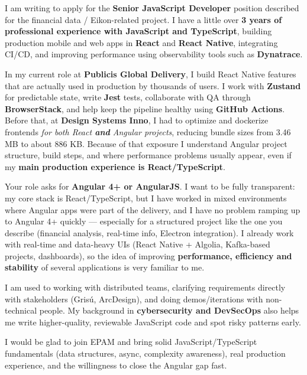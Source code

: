 \documentclass[11pt, a4paper]{awesome-cv}
\begin{document}
\makecvheader[R]
\makelettertitle

\begin{cvletter}

I am writing to apply for the \textbf{Senior JavaScript Developer} position described for the financial data / Eikon-related project. I have a little over \textbf{3 years of professional experience with JavaScript and TypeScript}, building production mobile and web apps in \textbf{React} and \textbf{React Native}, integrating CI/CD, and improving performance using observability tools such as \textbf{Dynatrace}.

In my current role at \textbf{Publicis Global Delivery}, I build React Native features that are actually used in production by thousands of users. I work with \textbf{Zustand} for predictable state, write \textbf{Jest} tests, collaborate with QA through \textbf{BrowserStack}, and help keep the pipeline healthy using \textbf{GitHub Actions}. Before that, at \textbf{Design Systems Inno}, I had to optimize and dockerize frontends \emph{for both React \textbf{and} Angular projects}, reducing bundle sizes from 3.46 MB to about 886 KB. Because of that exposure I understand Angular project structure, build steps, and where performance problems usually appear, even if my \textbf{main production experience is React/TypeScript}.

Your role asks for \textbf{Angular 4+ or AngularJS}. I want to be fully transparent: my core stack is React/TypeScript, but I have worked in mixed environments where Angular apps were part of the delivery, and I have no problem ramping up to Angular 4+ quickly — especially for a structured project like the one you describe (financial analysis, real-time info, Electron integration). I already work with real-time and data-heavy UIs (React Native + Algolia, Kafka-based projects, dashboards), so the idea of improving \textbf{performance, efficiency and stability} of several applications is very familiar to me.

I am used to working with distributed teams, clarifying requirements directly with stakeholders (Grisú, ArcDesign), and doing demos/iterations with non-technical people. My background in \textbf{cybersecurity and DevSecOps} also helps me write higher-quality, reviewable JavaScript code and spot risky patterns early.

I would be glad to join EPAM and bring solid JavaScript/TypeScript fundamentals (data structures, async, complexity awareness), real production experience, and the willingness to close the Angular gap fast.

\end{cvletter}

\makeletterclosing
\end{document}
